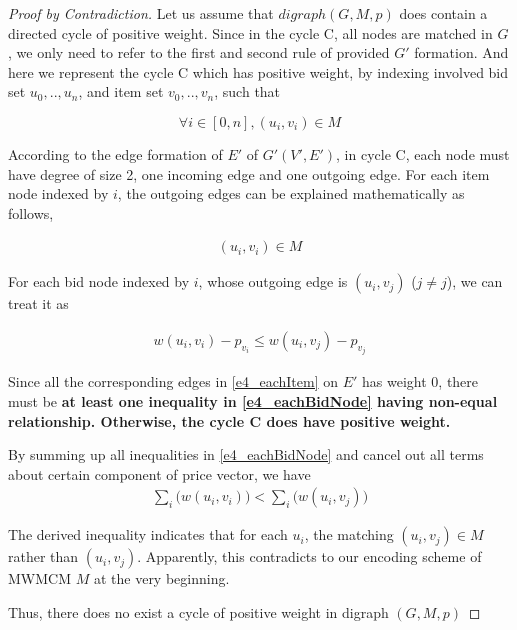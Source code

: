 \documentclass[11pt,a4paper]{article}
\begin{document}
\begin{proof} [Proof by Contradiction]
    Let us assume that $digraph(G,M,p)$ does contain a directed cycle of
    positive weight. Since in the cycle C, all nodes are matched in $G$, we
    only need to refer to the first and second rule of provided $G'$
    formation.
    And here we represent the cycle C which has positive weight,
    by indexing involved bid set ${u_0, .., u_n}$, and item set ${v_0, .., v_n}$,
    such that

    $$ \forall i \in [0,n], (u_i, v_i) \in M $$

    According to the edge formation of $E'$ of $G'(V', E')$, in cycle C, each
    node must have degree of size 2, one incoming edge and one outgoing edge.
    For each item node indexed by $i$, the outgoing edges can be explained
    mathematically as follows,

    \begin{align} \label{e4_eachItem}
        (u_i, v_i) \in M  
    \end{align}

    For each bid node indexed by $i$, whose outgoing edge is $(u_i, v_j)$ ($j
    \neq j$), we
    can treat it as 

    \begin{align} \label{e4_eachBidNode}
        w(u_i, v_i) - p_{v_i} \leq w(u_i, v_j) - p_{v_j}
    \end{align}

    Since all the corresponding edges in \eqref{e4_eachItem} on $E'$ has
    weight 0, there must be {\bf at least one inequality in \eqref{e4_eachBidNode}
    having non-equal relationship. Otherwise, the cycle C does have positive
    weight. }
    
    By summing up all inequalities in \eqref{e4_eachBidNode} and cancel out
    all terms about certain component of price vector, we have
    \begin{align}
        \sum_i \big( w(u_i, v_i) \big) < 
            \sum_i \big( w(u_i, v_j) \big)
    \end{align}

    The derived inequality indicates that for each $u_i$, the matching $(u_i,
    v_j) \in M$ rather than $(u_i, v_j)$.
    Apparently, this contradicts to our encoding scheme of MWMCM $M$ at the very
    beginning.

    Thus, there does no exist a cycle of positive weight in digraph $(G,M,p)$
\end{proof}

\end{document}
